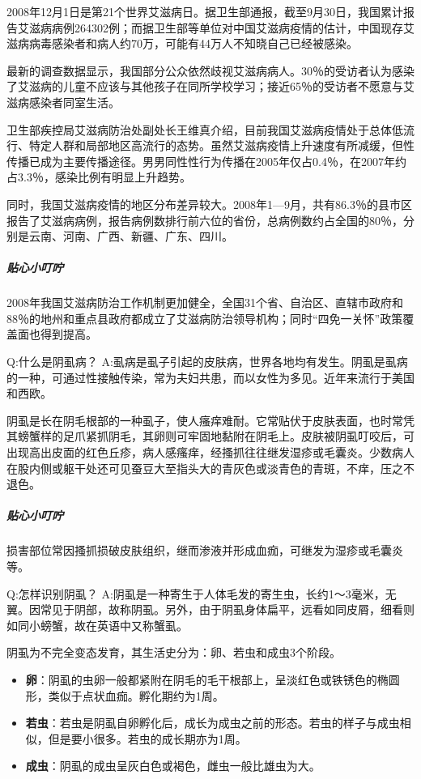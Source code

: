 \documentclass[12pt,UTF8]{ctexbook}
\begin{document}
2008年12月1日是第21个世界艾滋病日。据卫生部通报，截至9月30日，我国累计报告艾滋病病例264302例；而据卫生部等单位对中国艾滋病疫情的估计，中国现存艾滋病病毒感染者和病人约70万，可能有44万人不知晓自己已经被感染。

最新的调查数据显示，我国部分公众依然歧视艾滋病病人。30％的受访者认为感染了艾滋病的儿童不应该与其他孩子在同所学校学习；接近65％的受访者不愿意与艾滋病感染者同室生活。

卫生部疾控局艾滋病防治处副处长王维真介绍，目前我国艾滋病疫情处于总体低流行、特定人群和局部地区高流行的态势。虽然艾滋病疫情上升速度有所减缓，但性传播已成为主要传播途径。男男同性性行为传播在2005年仅占0.4％，在2007年约占3.3％，感染比例有明显上升趋势。

同时，我国艾滋病疫情的地区分布差异较大。2008年1—9月，共有86.3％的县市区报告了艾滋病病例，报告病例数排行前六位的省份，总病例数约占全国的80％，分别是云南、河南、广西、新疆、广东、四川。

\subparagraph{贴心小叮咛}

2008年我国艾滋病防治工作机制更加健全，全国31个省、自治区、直辖市政府和88％的地州和重点县政府都成立了艾滋病防治领导机构；同时“四免一关怀”政策覆盖面也得到提高。

Q:什么是阴虱病？
A:虱病是虱子引起的皮肤病，世界各地均有发生。阴虱是虱病的一种，可通过性接触传染，常为夫妇共患，而以女性为多见。近年来流行于美国和西欧。

阴虱是长在阴毛根部的一种虱子，使人瘙痒难耐。它常贴伏于皮肤表面，也时常凭其螃蟹样的足爪紧抓阴毛，其卵则可牢固地黏附在阴毛上。皮肤被阴虱叮咬后，可出现高出皮面的红色丘疹，病人感瘙痒，经搔抓往往继发湿疹或毛囊炎。少数病人在股内侧或躯干处还可见蚕豆大至指头大的青灰色或淡青色的青斑，不痒，压之不退色。

\subparagraph{贴心小叮咛}

损害部位常因搔抓损破皮肤组织，继而渗液并形成血痂，可继发为湿疹或毛囊炎等。

Q:怎样识别阴虱？
A:阴虱是一种寄生于人体毛发的寄生虫，长约1～3毫米，无翼。因常见于阴部，故称阴虱。另外，由于阴虱身体扁平，远看如同皮屑，细看则如同小螃蟹，故在英语中又称蟹虱。

阴虱为不完全变态发育，其生活史分为：卵、若虫和成虫3个阶段。

\begin{itemize}
\item \textbf{卵}：阴虱的虫卵一般都紧附在阴毛的毛干根部上，呈淡红色或铁锈色的椭圆形，类似于点状血痂。孵化期约为1周。
\item \textbf{若虫}：若虫是阴虱自卵孵化后，成长为成虫之前的形态。若虫的样子与成虫相似，但是要小很多。若虫的成长期亦为1周。
\item \textbf{成虫}：阴虱的成虫呈灰白色或褐色，雌虫一般比雄虫为大。
\end{itemize}
\end{document}
